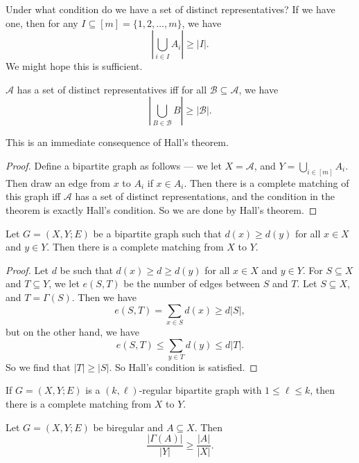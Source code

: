 \documentclass[a4paper]{article}
\begin{document}
Under what condition do we have a set of distinct representatives? If we have one, then for any $I \subseteq [m] = \{1, 2, \ldots, m\}$, we have
\[
  \left|\bigcup_{i \in I} A_i \right| \geq |I|.
\]
We might hope this is sufficient.
\begin{thm}
  $\mathcal{A}$ has a set of distinct representatives iff for all $\mathcal{B} \subseteq \mathcal{A}$, we have
  \[
    \left|\bigcup_{B \in \mathcal{B}} B\right| \geq |\mathcal{B}|.
  \]
\end{thm}

This is an immediate consequence of Hall's theorem.

\begin{proof}
  Define a bipartite graph as follows --- we let $X = \mathcal{A}$, and $Y = \bigcup_{i \in [m]} A_i$. Then draw an edge from $x$ to $A_i$ if $x \in A_i$. Then there is a complete matching of this graph iff $\mathcal{A}$ has a set of distinct representations, and the condition in the theorem is exactly Hall's condition. So we are done by Hall's theorem.
\end{proof}

\begin{thm}
  Let $G = (X, Y; E)$ be a bipartite graph such that $d(x) \geq d(y)$ for all $x \in X$ and $y \in Y$. Then there is a complete matching from $X$ to $Y$.
\end{thm}

\begin{proof}
  Let $d$ be such that $d(x) \geq d \geq d(y)$ for all $x \in X$ and $y \in Y$. For $S \subseteq X$ and $T \subseteq Y$, we let $e(S, T)$ be the number of edges between $S$ and $T$. Let $S \subseteq X$, and $T = \Gamma(S)$. Then we have
  \[
    e(S, T) = \sum_{x \in S} d(x) \geq d |S|,
  \]
  but on the other hand, we have
  \[
    e(S, T) \leq \sum_{y \in T} d(y) \leq d |T|.
  \]
  So we find that $|T| \geq |S|$. So Hall's condition is satisfied.
\end{proof}

\begin{cor}
  If $G = (X, Y; E)$ is a $(k, \ell)$-regular bipartite graph with $1 \leq \ell \leq k$, then there is a complete matching from $X$ to $Y$.
\end{cor}

\begin{thm}
  Let $G = (X, Y; E)$ be biregular and $A \subseteq X$. Then
  \[
    \frac{|\Gamma(A)|}{|Y|}\geq \frac{|A|}{|X|}.
  \]
\end{thm}
\end{document}
